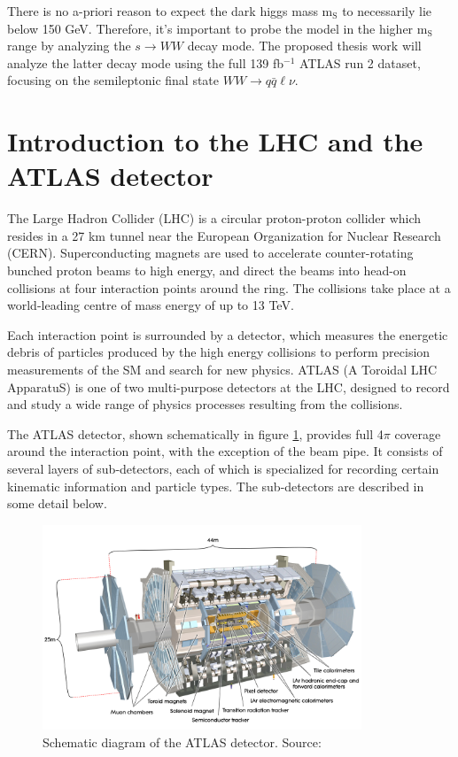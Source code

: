 \documentclass[12pt]{article}
\begin{document}
There is no a-priori reason to expect the dark higgs mass m$_\text{S}$ to necessarily lie below 150 GeV. Therefore, it's important to probe the model in the higher m$_\text{S}$ range by analyzing the $s \rightarrow WW$ decay mode. The proposed thesis work will analyze the latter decay mode using the full 139 fb$^{-1}$ ATLAS run 2 dataset, focusing on the semileptonic final state $WW \rightarrow q\bar{q}\ell\nu$.

\section{Introduction to the LHC and the ATLAS detector}

The Large Hadron Collider (LHC) \cite{lhc_machine} is a circular proton-proton collider which resides in a 27 km tunnel near the European Organization for Nuclear Research (CERN). Superconducting magnets are used to accelerate counter-rotating bunched proton beams to high energy, and direct the beams into head-on collisions at four interaction points around the ring. The collisions take place at a world-leading centre of mass energy of up to 13 TeV. 

Each interaction point is surrounded by a detector, which measures the energetic debris of particles produced by the high energy collisions to perform precision measurements of the SM and search for new physics. ATLAS (A Toroidal LHC ApparatuS) \cite{atlas} is one of two multi-purpose detectors at the LHC, designed to record and study a wide range of physics processes resulting from the collisions. 

The ATLAS detector, shown schematically in figure \ref{fig:detector}, provides full 4$\pi$ coverage around the interaction point, with the exception of the beam pipe. It consists of several layers of sub-detectors, each of which is specialized for recording certain kinematic information and particle types. The sub-detectors are described in some detail below. 

\begin{figure}[H]
	\centering
	\includegraphics[width=0.85\textwidth]{figures/detector.jpg}
	\caption[]{Schematic diagram of the ATLAS detector. Source: \cite{atlas}}
	\label{fig:detector}
\end{figure}
\end{document}

